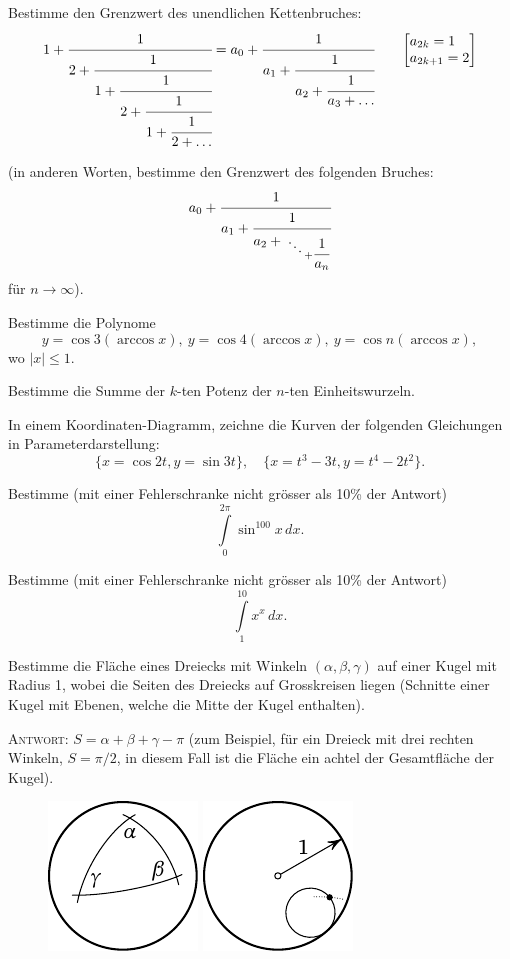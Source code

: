 \documentclass[12pt]{article} %
\begin{document}
\newpage
{} Bestimme den Grenzwert des unendlichen Kettenbruches:
\begin{align*}
1+\cfrac{1}{2+\cfrac{1}{1+\cfrac{1}{2+\cfrac{1}{1+\cfrac{1}{2+\ldots}}}}}=
a_0+\cfrac{1}{a_1+\cfrac{1}{a_2+\cfrac{1}{a_3+\dots}}} \qquad
\smash{
{\left[\begin{aligned} &a_{2k}=1 \\[-\jot] &a_{2k+1}
=2 \end{aligned}\right]} }
\end{align*}

\medskip

\noindent (in anderen Worten, bestimme den Grenzwert des folgenden Bruches:
$$
a_0+\cfrac{1}{a_1+\cfrac{1}{a_2+{\atop{\ddots \atop {}} + \cfrac{1}{a_n}}
} 
}
$$
für $n \to \infty$).


\bigskip
{} Bestimme die Polynome 
\[
y=\cos 3 (\arccos x),\ y=\cos 4 (\arccos x),\ 
y=\cos n (\arccos x),
\] 
wo $|x| \leqslant 1$. 


\bigskip
{} Bestimme die Summe der $k$-ten Potenz der $n$-ten Einheitswurzeln.

\bigskip
{} In einem Koordinaten-Diagramm, zeichne die Kurven der folgenden Gleichungen in Parameterdarstellung: 
\[
\{x=\cos 2t, y=\sin 3t\},\quad 
\{x=t^3-3t, y=t^4-2t^2\}.
\]

\bigskip
{} Bestimme (mit einer Fehlerschranke nicht grösser als 10\% der Antwort)
$$
\int\limits_0^{2\pi} \sin^{100} x\,dx.
$$

\bigskip
{} 
Bestimme (mit einer Fehlerschranke nicht grösser als 10\% der Antwort)
$$
\int\limits_1^{10} x^x\,dx.
$$

\bigskip
{} Bestimme die Fläche eines Dreiecks mit Winkeln $(\alpha, \beta, \gamma)$ auf einer Kugel mit Radius 1, wobei die Seiten des Dreiecks auf Grosskreisen liegen (Schnitte einer Kugel mit Ebenen, welche die Mitte der Kugel enthalten).

\medskip
\textsc{Antwort:} $S=\alpha+\beta+\gamma-\pi$ (zum Beispiel, für ein Dreieck mit drei rechten Winkeln, $S=\pi/2$, in diesem Fall ist die Fläche ein achtel der Gesamtfläche der Kugel).
\begin{figure}[h]
\centering
\includegraphics{taskbook-44}\hskip2cm \includegraphics{taskbook-45}
\end{figure}
\end{document}
